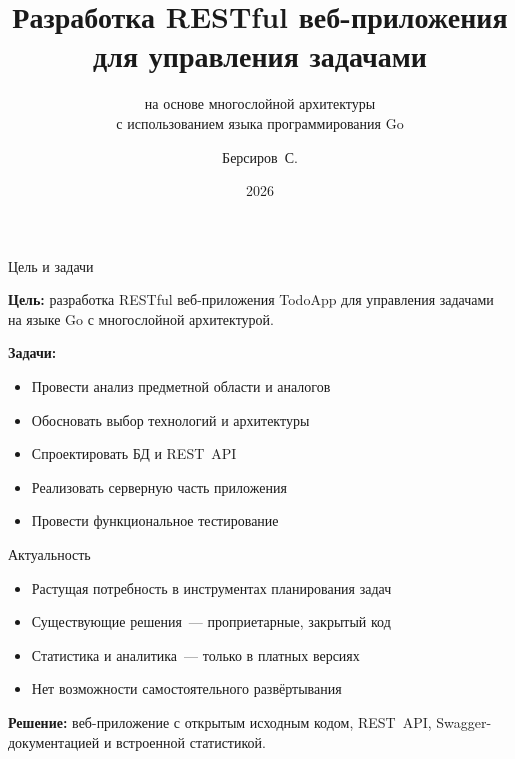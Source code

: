 \documentclass[aspectratio=169, 14pt]{beamer}
\title{Разработка RESTful веб-приложения\\для управления задачами}
\subtitle{на основе многослойной архитектуры\\с использованием языка программирования Go}
\author{Берсиров~С.}
\institute{ДГТУ, Факультет информатики и ВТ\\Кафедра информатики}
\date{2026}
\begin{document}
\begin{frame}
\titlepage
\end{frame}

\begin{frame}{Цель и задачи}

\textbf{Цель:} разработка RESTful веб-приложения TodoApp для управления задачами на языке Go с многослойной архитектурой.

\vspace{0.5cm}
\textbf{Задачи:}
\begin{itemize}
  \item Провести анализ предметной области и аналогов
  \item Обосновать выбор технологий и архитектуры
  \item Спроектировать БД и REST~API
  \item Реализовать серверную часть приложения
  \item Провести функциональное тестирование
\end{itemize}
\end{frame}

\begin{frame}{Актуальность}

\begin{itemize}
  \item Растущая потребность в инструментах планирования задач
  \item Существующие решения~--- проприетарные, закрытый код
  \item Статистика и аналитика~--- только в платных версиях
  \item Нет возможности самостоятельного развёртывания
\end{itemize}

\vspace{0.5cm}
\textbf{Решение:} веб-приложение с открытым исходным кодом, REST~API, Swagger-документацией и встроенной статистикой.

\end{frame}
\end{document}
